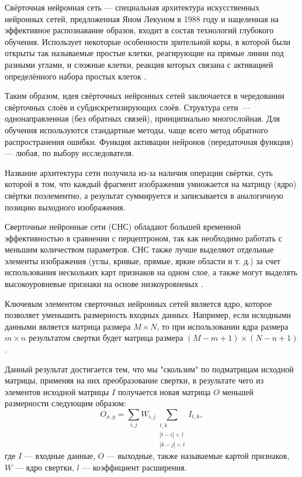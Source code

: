 Свёрточная нейронная сеть — специальная архитектура искусственных нейронных сетей, предложенная Яном Лекуном в 1988 году и нацеленная на эффективное распознавание образов, входит в состав технологий глубокого обучения. 
Использует некоторые особенности зрительной коры, в которой были открыты так называемые простые клетки, реагирующие на прямые линии под разными углами, и сложные клетки, реакция которых связана с активацией определённого набора простых клеток \cite{fan}. 

Таким образом, идея свёрточных нейронных сетей заключается в чередовании свёрточных слоёв и субдискретизирующих слоёв. Структура сети — однонаправленная (без обратных связей), принципиально многослойная. Для обучения используются стандартные методы, чаще всего метод обратного распространения ошибки. Функция активации нейронов (передаточная функция) — любая, по выбору исследователя.

Название архитектура сети получила из-за наличия операции свёртки, суть которой в том, что каждый фрагмент изображения умножается на матрицу (ядро) свёртки поэлементно, а результат суммируется и записывается в аналогичную позицию выходного изображения. 

Сверточные нейронные сети (СНС) обладают большей временной эффективностью в сравнении с перцептроном, так как необходимо
работать с меньшим количеством параметров. СНС также лучше выделяют отдельные элементы изображения (углы,
кривые, прямые, яркие области и т. д.) за счет использования нескольких карт признаков на одном слое, а также могут 
выделять высокоуровневые признаки на основе низкоуровневых \cite{cyberbred}.

Ключевым элементом сверточных нейронных сетей является ядро, которое позволяет уменьшить размерность входных данных.
Например, если исходными данными является матрица размера $M\times N$, то при использовании ядра размера $m\times n$ результатом свертки будет
матрица размера $(M-m+1)\times(N-n+1)$ \cite{cyberbred}.

Данный результат достигается тем, что мы "скользим" по подматрицам исходной матрицы, применяя на них преобразование свертки,
в результате чего из элементов исходной матрицы $I$ получается новая матрица $O$ меньшей размерности следующим образом:
\begin{equation}
	O_{x,y} = \sum_{i,j} W_{i,j} \sum_{\substack{t,k\\\left|t-i\right|<l\\ \left|k-j\right|<l} } I_{t,k},
\end{equation}
где 
$I$ — входные данные, $O$ — выходные, также называемые картой признаков, $W$ — ядро свертки, $l$ — коэффициент расширения. 

